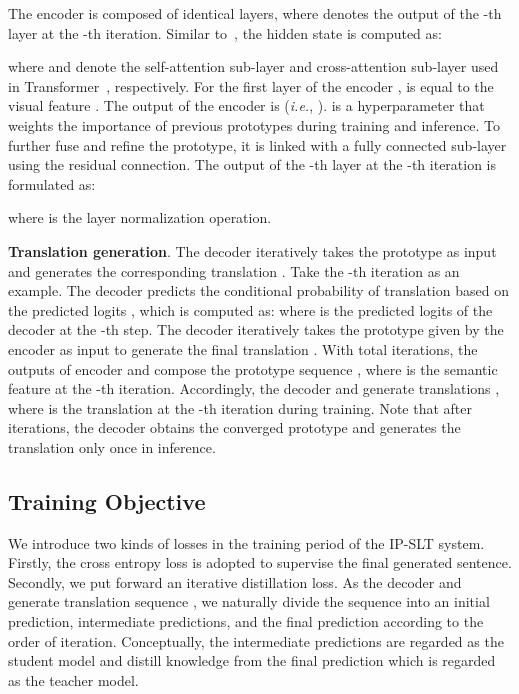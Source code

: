 \documentclass[10pt,twocolumn,letterpaper]{article}
\begin{document}
    The encoder  is composed of  identical layers, where  denotes the output of the -th layer at the -th iteration. 
    Similar to~\cite{zhu2020incorporating}, the hidden state is computed as:
    
    where  and  denote the self-attention sub-layer and cross-attention sub-layer used in Transformer~\cite{vaswani2017attention}, respectively.
    For the first layer of the encoder ,  is equal to the visual feature .
    The output of the encoder  is  (\emph{i.e.}, ).
     is a hyperparameter that weights the importance of previous prototypes during training and inference. To further fuse and refine the prototype, it is linked with a fully connected sub-layer  using the residual connection. The output of the -th layer at the -th iteration is formulated as:
    
    where  is the layer normalization operation.

    \smallskip
    \noindent \textbf{Translation generation}.
    The decoder  iteratively takes the prototype  as input and generates the corresponding translation . Take the -th iteration as an example. 
    The decoder  predicts the conditional probability of translation  based on the predicted logits , which is computed as:\vspace{-1mm}
    \vspace{-1mm}
    where  is the predicted logits of the decoder  at the -th step.
    The decoder  iteratively takes the prototype given by the encoder  as input to generate the final translation . With total  iterations, the outputs of encoder  and  compose the prototype sequence , where  is the semantic feature at the -th iteration. Accordingly, the decoder  and  generate  translations , where  is the translation at the -th iteration during training. Note that after  iterations, the decoder  obtains the converged prototype  and generates the translation only once in inference. 
    
    \subsection{Training Objective}
    We introduce two kinds of losses in the training period of the IP-SLT system.
    Firstly, the cross entropy loss is adopted to supervise the final generated sentence.
    Secondly, we put forward an iterative distillation loss. As the decoder  and  generate translation sequence , we naturally divide the sequence  into an initial prediction,  intermediate predictions, and the final prediction according to the order of iteration. 
    Conceptually, the  intermediate predictions are regarded as the student model and distill knowledge from the final prediction which is regarded as the teacher model. 
\end{document}
